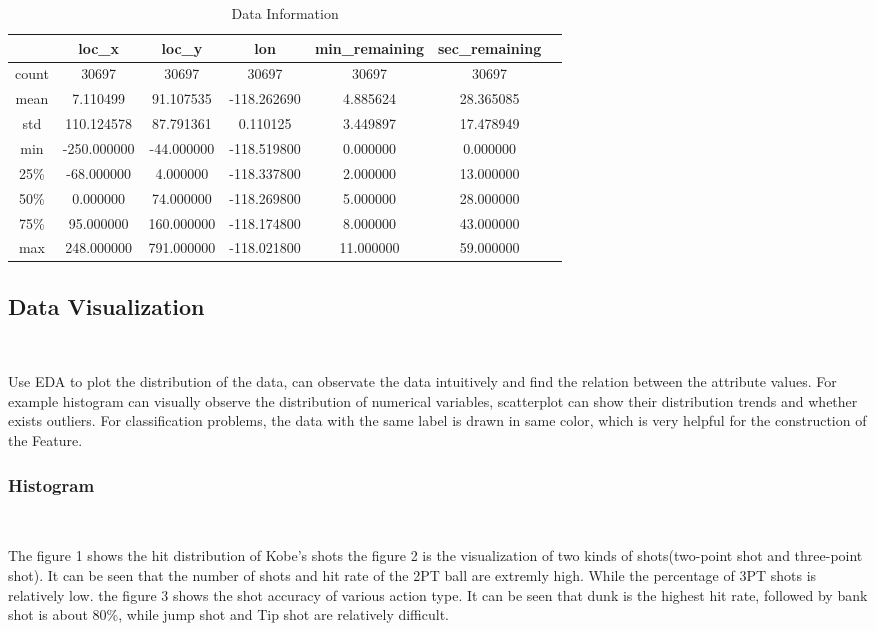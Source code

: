 \begin{table}[htbp]  \centering
	\caption{Data Information}
	\label{tbl:data information}		
	\begin{tabular}{ccccccc}
		\hline
		 & loc\_x & loc\_y & lon & min\_remaining & sec\_remaining \\
		\hline
		count & 30697 & 30697 & 30697 & 30697 & 30697  \\
		mean  & 7.110499	& 91.107535 & -118.262690 & 4.885624 & 28.365085\\
		std 	& 110.124578 & 87.791361 & 0.110125	& 3.449897 & 17.478949  \\
		min 	& -250.000000 & -44.000000 & -118.519800 & 0.000000	& 0.000000  \\
		25\%  & -68.000000 & 4.000000 & -118.337800 & 2.000000 & 13.000000\\
		50\%  & 0.000000	& 74.000000	& -118.269800	& 5.000000	& 28.000000	\\
		75\% & 95.000000 & 160.000000 & -118.174800 & 8.000000 & 43.000000 \\
		max  & 248.000000 & 791.000000 & -118.021800 & 11.000000 & 59.000000 \\
		\hline 
	\end{tabular}
\end{table}

\subsection{Data Visualization}
\

Use EDA to plot the distribution of the data,
can observate the data intuitively and
find the relation between the attribute values. 
For example histogram can visually observe 
the distribution of numerical variables, 
scatterplot can show their distribution trends 
and whether exists outliers.
For classification problems, 
the data with the same label is drawn in same color, 
which is very helpful for 
the construction of the Feature.

\subsubsection{ Histogram}
\

The figure 1
shows the hit distribution of Kobe's shots  
the figure 2
is the visualization of two kinds of shots(two-point shot and three-point shot).
It can be seen that the number of shots and hit rate of the 2PT ball are extremly high. 
While the percentage of 3PT shots is relatively low.
the figure 3 
shows the shot accuracy of various action type.
It can be seen that dunk is the highest hit rate, followed by bank shot is about 80\%,
while jump shot and Tip shot are relatively difficult.

